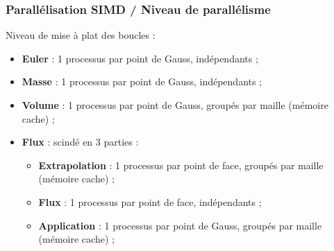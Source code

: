 \begin{frame}
\frametitle{Parallélisation SIMD / Niveau de parallélisme}
\vfill
Niveau de mise à plat des boucles :
\begin{itemize}
\item \textbf{Euler} : 1 processus par point de Gauss, indépendants ;
\item \textbf{Masse} : 1 processus par point de Gauss, indépendants ;
\item \textbf{Volume} : 1 processus par point de Gauss, groupés par maille (mémoire cache) ;
\item \textbf{Flux} : scindé en 3 parties :
\begin{itemize}
\item \textbf{Extrapolation} : 1 processus par point de face, groupés par maille (mémoire cache) ;
\item \textbf{Flux} : 1 processus par point de face, indépendants ;
\item \textbf{Application} : 1 processus par point de Gauss, groupés par maille (mémoire cache) ;
\end{itemize}
\end{itemize}
\vfill
\end{frame}

